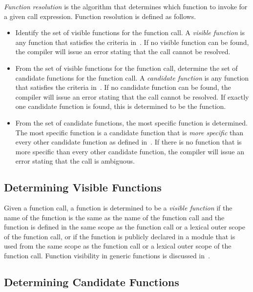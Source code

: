 \emph{Function resolution} is the algorithm that determines
which function to invoke for a given call expression.
Function resolution is defined as follows.
\begin{itemize}
\item
Identify the set of visible functions for the function call.  A
\emph{visible function} is any function that satisfies the criteria
in~.  If no visible function can
be found, the compiler will issue an error stating that the call
cannot be resolved.
\item
From the set of visible functions for the function call, determine the
set of candidate functions for the function call.  A \emph{candidate
function} is any function that satisfies the criteria
in~.  If no candidate function
can be found, the compiler will issue an error stating that the call
cannot be resolved.  If exactly one candidate function is found, this
is determined to be the function.
\item
From the set of candidate functions, the most specific function is
determined.  The most specific function is a candidate function that
is \emph{more specific} than every other candidate function as defined
in~.  If there is no
function that is more specific than every other candidate function,
the compiler will issue an error stating that the call is ambiguous.
\end{itemize}

\subsection{Determining Visible Functions}
\label{Determining_Visible_Functions}

Given a function call, a function is determined to be a \emph{visible
function} if the name of the function is the same as the name of the
function call and the function is defined in the same scope as the
function call or a lexical outer scope of the function call, or if the
function is publicly declared in a module that is used from the same
scope as the function call or a lexical outer scope of the function
call.  Function visibility in generic functions is discussed
in~.

\subsection{Determining Candidate Functions}
\label{Determining_Candidate_Functions}

